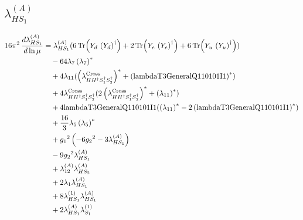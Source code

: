 \documentclass[10pt,a4paper]{article}
\begin{document}
\subsection*{$\lambda_{HS_1}^{(A)}$}
\begin{align*}
16\pi^2\,\frac{d \lambda_{HS_1}^{(A)}}{d\ln\mu} &={\lambda_{HS_1}^{(A)}} (6 \operatorname{Tr}\!\left({Y_d}\,\left({Y_d}\right)^{\dagger}\right)+2 \operatorname{Tr}\!\left({Y_e}\,\left({Y_e}\right)^{\dagger}\right)+6 \operatorname{Tr}\!\left({Y_u}\,\left({Y_u}\right)^{\dagger}\right)) \\
&\quad -64 {\lambda_{7}} \left({\lambda_{7}}\right)^{*} \\
&\quad +4 {\lambda_{11}} (\left({\lambda_{H H^\dagger S_1^\dagger S_2^\dagger}^{\rm Cross}}\right)^{*}+\left(\text{lambdaT3GeneralQ110101I1}\right)^{*}) \\
&\quad +4 {\lambda_{H H^\dagger S_1^\dagger S_2^\dagger}^{\rm Cross}} (2 \left({\lambda_{H H^\dagger S_1^\dagger S_2^\dagger}^{\rm Cross}}\right)^{*}+\left({\lambda_{11}}\right)^{*}) \\
&\quad +4 \text{lambdaT3GeneralQ110101I1} (\left({\lambda_{11}}\right)^{*}-2 \left(\text{lambdaT3GeneralQ110101I1}\right)^{*}) \\
&\quad +\frac{16}{3} {\lambda_5} \left({\lambda_5}\right)^{*} \\
&\quad +{g_1}^2 \left(-6 {g_2}^2-3 {\lambda_{HS_1}^{(A)}}\right) \\
&\quad -9 {g_2}^2 {\lambda_{HS_1}^{(A)}} \\
&\quad +{\lambda_{12}^{(A)}} {\lambda_{HS_2}^{(A)}} \\
&\quad +2 {\lambda_1} {\lambda_{HS_1}^{(A)}} \\
&\quad +8 {\lambda_{HS_1}^{(1)}} {\lambda_{HS_1}^{(A)}} \\
&\quad +2 {\lambda_{HS_1}^{(A)}} {\lambda_{S_1}^{(1)}} \\
\end{align*}
\end{document}
